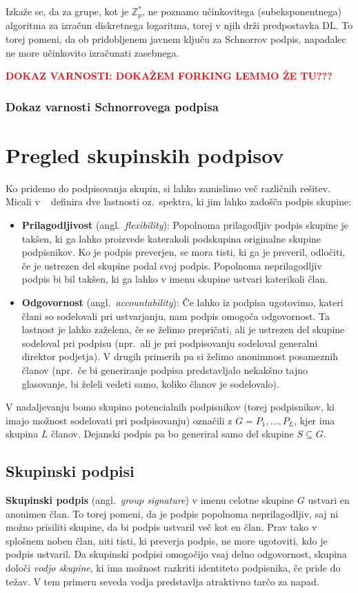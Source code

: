 \documentclass[isrm2, tisk]{fmfdelo}
\newcommand{\Z}{\mathbb Z}
\newcommand{\todo}[1]{\textcolor{red}{\textbf{\uppercase{#1}??}}}
\begin{document}
Izkaže se, da za grupe, kot je $\Z_p^*$, ne poznamo učinkovitega (subeksponentnega) algoritma za 
izračun diskretnega logaritma, torej v njih drži predpostavka DL. To torej pomeni, da ob pridobljenem 
javnem ključu za Schnorrov podpis, napadalec ne more učinkovito izračunati zasebnega.

\todo{dokaz varnosti: dokažem forking lemmo že tu?}
\subsubsection{Dokaz varnosti Schnorrovega podpisa}

\section{Pregled skupinskih podpisov}
\label{sec:skpine}
Ko pridemo do podpisovanja skupin, si lahko zamislimo več različnih rešitev. Micali v ~\cite{micali2001asm} 
definira dve lastnosti oz.\ spektra, ki jim lahko zadošča podpis skupine:
\begin{itemize}
    \item \textbf{Prilagodljivost} (angl.\ \textit{flexibility}): Popolnoma prilagodljiv podpis skupine
        je takšen, ki ga lahko proizvede katerakoli podskupina originalne skupine podpisnikov. Ko je podpis 
        preverjen, se mora tisti, ki ga je preveril, odločiti, če je ustrezen del skupine podal svoj podpis. 
        Popolnoma neprilagodljiv podpis bi bil takšen, ki ga lahko v imenu skupine ustvari katerikoli član.
    \item \textbf{Odgovornost} (angl.\ \textit{accountability}): Če lahko iz podpisa ugotovimo, kateri člani 
        so sodelovali pri ustvarjanju, nam podpis omogoča odgovornost. Ta lastnost je lahko zaželena, če 
        se želimo prepričati, ali je ustrezen del skupine sodeloval pri podpisu (npr.\ ali je pri podpisovanju 
        sodeloval generalni direktor podjetja). V drugih primerih pa si želimo anonimnost posameznih članov 
        (npr.\ če bi generiranje podpisa predstavljalo nekakšno tajno glasovanje, bi želeli vedeti samo, koliko 
        članov je sodelovalo).
\end{itemize}

V nadaljevanju bomo skupino potencialnih podpisnikov (torej podpisnikov, ki imajo možnost sodelovati pri 
podpisovanju) označili z $G = P_1, \dots, P_L$, kjer ima skupina $L$ članov. Dejanski podpis pa bo 
generiral samo del skupine $S \subseteq G$.

\subsection{Skupinski podpisi}
\textbf{Skupinski podpis} (angl.\ \textit{group signature}) v imenu celotne skupine $G$ ustvari en 
anonimen član. To torej pomeni, da je podpis popolnoma neprilagodljiv, saj ni možno prisiliti skupine,
da bi podpis ustvaril več kot en član. Prav tako v splošnem noben član, niti tisti, ki preverja podpis,
ne more ugotoviti, kdo je podpis ustvaril. Da skupinski podpisi omogočijo vsaj delno odgovornost, 
skupina določi \textit{vodjo skupine}, ki ima možnost razkriti identiteto podpisnika, če pride do 
težav. V tem primeru seveda vodja predstavlja atraktivno tarčo za napad.
\end{document}
